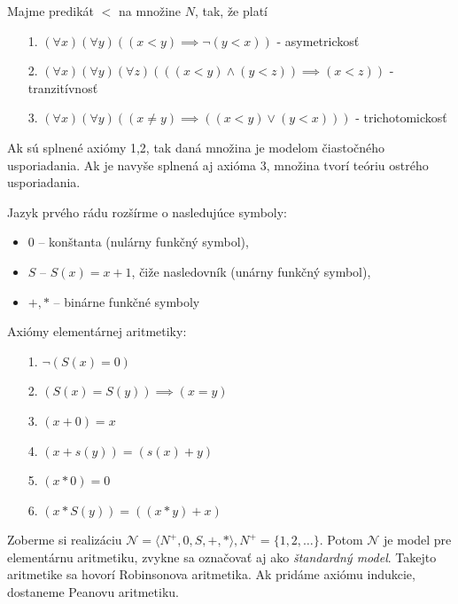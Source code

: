\begin{priklad}
    Majme predikát $<$ na množine $N$, tak, že platí
    \begin{itemize}
    \item[1.] $(\forall x)(\forall y) ((x < y) \implies \neg (y < x))$
    - asymetrickosť
    \item[2.] $(\forall x)(\forall y)(\forall z) (((x<y) \land (y<z)) \implies
        (x<z))$ - tranzitívnosť
    \item[3.] $(\forall x)(\forall y)( (x\not=y) \implies ((x<y) \lor (y<x)))$ -
     trichotomickosť
    \end{itemize}
    Ak sú splnené axiómy 1,2, tak daná množina je modelom čiastočného
    usporiadania. Ak je
    navyše splnená aj axióma 3, množina tvorí teóriu ostrého
    usporiadania.
\end{priklad}

\begin{priklad}
    Jazyk prvého rádu rozšírme o nasledujúce symboly:
    \begin{itemize}
        \item $0$ -- konštanta (nulárny funkčný symbol),
        \item $S$ -- $S(x)=x+1$, čiže nasledovník (unárny funkčný symbol),
        \item $+,*$ -- binárne funkčné symboly
    \end{itemize}
    Axiómy elementárnej aritmetiky:
    \begin{itemize}
        \item[1.] $\neg (S(x) = 0)$
        \item[2.] $(S(x) = S(y)) \implies (x=y)$
        \item[3.] $(x+0) = x$
        \item[4.] $(x+s(y)) = (s(x) + y)$
        \item[5.] $(x * 0) = 0$
        \item[6.] $(x * S(y)) = ((x*y)+x)$
    \end{itemize}
    Zoberme si realizáciu 
        $\mathcal{N}=\langle N^+,0,S,+,* \rangle, N^+ =
        \{1,2,\dots\}$.
        Potom $\mathcal{N}$ je model pre elementárnu aritmetiku,
        zvykne sa označovať aj ako \emph{štandardný model}.
        Takejto aritmetike sa hovorí Robinsonova aritmetika.
        Ak pridáme axiómu indukcie, dostaneme Peanovu aritmetiku.
\end{priklad}

